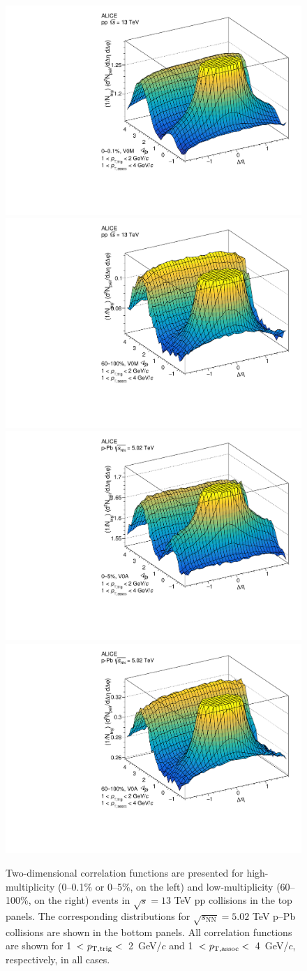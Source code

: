\begin{figure}[h!]
		\includegraphics[width=0.5 \textwidth]{figures/Fig1_ppHigh.pdf} 
		\includegraphics[width=0.5 \textwidth]{figures/Fig1_ppLow.pdf} 
  		\includegraphics[width=0.5 \textwidth]{figures/Fig1_pPbHigh.pdf}
		\includegraphics[width=0.5 \textwidth]{figures/Fig1_pPbLow.pdf}
\caption{Two-dimensional correlation functions are presented for high-multiplicity (0--0.1\% or 0--5\%, on the left) and low-multiplicity (60--100\%, on the right) events in $\sqrt{s}=13$ TeV pp collisions in the top panels. The corresponding distributions for $\sqrt{s_{\mathrm{NN}}}=5.02$ TeV p--Pb collisions are shown in the bottom panels. All correlation functions are shown for 1~$<\it{p}_{\rm{T,trig}}<$~2~GeV/$c$ and 1~$<\it{p}_{\rm{T,assoc}}<$~4~GeV/$c$, respectively, in all cases.}
\label{fig:doubleridge}
\end{figure}

